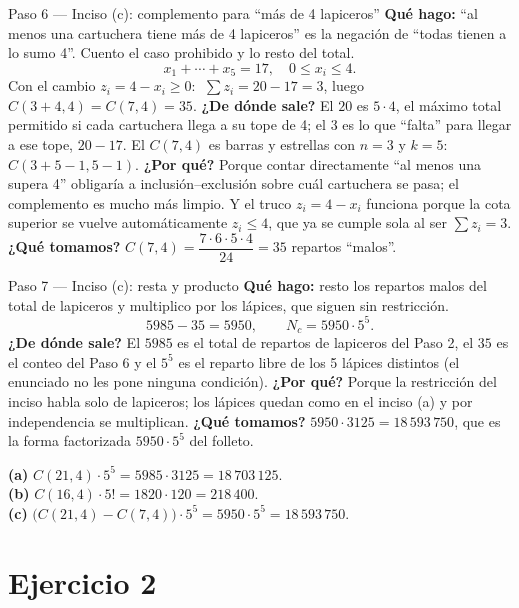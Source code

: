 \documentclass[11pt]{article}
\begin{document}
\begin{paso}{Paso 6 --- Inciso (c): complemento para ``más de 4 lapiceros''}
\textbf{Qué hago:} ``al menos una cartuchera tiene más de 4 lapiceros'' es la negación de ``todas tienen a lo sumo 4''. Cuento el caso prohibido y lo resto del total.
\[
x_1+\cdots+x_5=17,\quad 0\le x_i\le 4 .
\]
Con el cambio $z_i=4-x_i\ge0$: $\;\sum z_i=20-17=3$, luego $C(3+4,4)=C(7,4)=35$.
\textbf{¿De dónde sale?} El $20$ es $5\cdot 4$, el máximo total permitido si cada cartuchera llega a su tope de 4; el $3$ es lo que ``falta'' para llegar a ese tope, $20-17$. El $C(7,4)$ es barras y estrellas con $n=3$ y $k=5$: $C(3+5-1,5-1)$.
\textbf{¿Por qué?} Porque contar directamente ``al menos una supera 4'' obligaría a inclusión--exclusión sobre cuál cartuchera se pasa; el complemento es mucho más limpio. Y el truco $z_i=4-x_i$ funciona porque la cota superior se vuelve automáticamente $z_i\le 4$, que ya se cumple sola al ser $\sum z_i=3$.
\textbf{¿Qué tomamos?} $C(7,4)=\dfrac{7\cdot6\cdot5\cdot4}{24}=35$ repartos ``malos''.
\end{paso}

\begin{paso}{Paso 7 --- Inciso (c): resta y producto}
\textbf{Qué hago:} resto los repartos malos del total de lapiceros y multiplico por los lápices, que siguen sin restricción.
\[
5985-35=5950,\qquad N_c=5950\cdot 5^5 .
\]
\textbf{¿De dónde sale?} El $5985$ es el total de repartos de lapiceros del Paso 2, el $35$ es el conteo del Paso 6 y el $5^5$ es el reparto libre de los 5 lápices distintos (el enunciado no les pone ninguna condición).
\textbf{¿Por qué?} Porque la restricción del inciso habla solo de lapiceros; los lápices quedan como en el inciso (a) y por independencia se multiplican.
\textbf{¿Qué tomamos?} $5950\cdot 3125=18\,593\,750$, que es la forma factorizada $5950\cdot 5^5$ del folleto.
\end{paso}

\begin{resp}
\textbf{(a)} $C(21,4)\cdot 5^5=5985\cdot 3125=18\,703\,125$.\\
\textbf{(b)} $C(16,4)\cdot 5!=1820\cdot 120=218\,400$.\\
\textbf{(c)} $\bigl(C(21,4)-C(7,4)\bigr)\cdot 5^5=5950\cdot 5^5=18\,593\,750$.
\end{resp}

\section*{Ejercicio 2}
\end{document}
